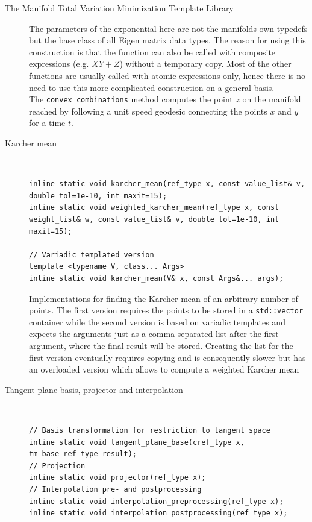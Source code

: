 \begin{chapter}{The Manifold Total Variation Minimization Template Library}
\begin{description}
	The parameters of the exponential here are not the manifolds own typedefs but the base class of all Eigen matrix data types. The reason for using this construction is that the function
	can also be called with composite expressions (e.g. $XY+Z$) without a temporary copy. Most of the other functions are usually called with atomic expressions only, hence there is no
	need to use this more complicated construction on a general basis.\\
	The \texttt{convex\_combinations} method computes the point $z$ on the manifold reached by following a unit speed geodesic connecting the points $x$ and $y$ for a time $t$.

    \item[Karcher mean] \hfill \\
	\cppinline
	\begin{lstlisting}
inline static void karcher_mean(ref_type x, const value_list& v, double tol=1e-10, int maxit=15);
inline static void weighted_karcher_mean(ref_type x, const weight_list& w, const value_list& v, double tol=1e-10, int maxit=15);

// Variadic templated version
template <typename V, class... Args>
inline static void karcher_mean(V& x, const Args&... args);
	\end{lstlisting}
	
	Implementations for finding the Karcher mean of an arbitrary number of points. The first version requires the points to be stored in a \texttt{std::vector} container while
	the second version is based on variadic templates and expects the arguments just as a comma separated list after the first argument, where the final result will be stored.
	Creating the list for the first version eventually requires copying and is consequently slower but has an overloaded version which allows to compute a weighted Karcher mean
    
    \item[Tangent plane basis, projector and interpolation] \hfill \\
	\cppinline
	\begin{lstlisting}
// Basis transformation for restriction to tangent space
inline static void tangent_plane_base(cref_type x, tm_base_ref_type result);
// Projection
inline static void projector(ref_type x);
// Interpolation pre- and postprocessing
inline static void interpolation_preprocessing(ref_type x);
inline static void interpolation_postprocessing(ref_type x);
	\end{lstlisting}


\end{description}
\end{chapter}
